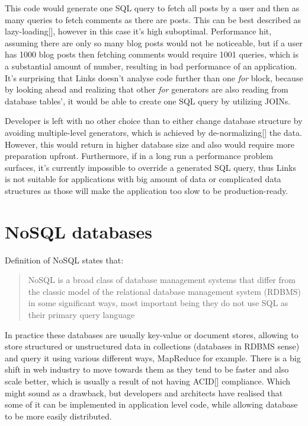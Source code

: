 This code would generate one SQL query to fetch all posts by a user and then as many queries to fetch comments as there are posts. This can be best described as lazy-loading[], however in this case it's high suboptimal. Performance hit, assuming there are only so many blog posts would not be noticeable, but if a user has 1000 blog posts then fetching comments would require 1001 queries, which is a substantial amount of number, resulting in bad performance of an application. It's surprising that Links doesn't analyse code further than one \textit{for} block, because by looking ahead and realizing that other \textit{for} generators are also reading from database tables', it would be able to create one SQL query by utilizing JOINs. 

Developer is left with no other choice than to either change database structure by avoiding multiple-level generators, which is achieved by de-normalizing[] the data. However, this would return in higher database size and also would require more preparation upfront. Furthermore, if in a long run a performance problem surfaces, it's currently impossible to override a generated SQL query, thus Links is not suitable for applications with big amount of data or complicated data structures as those will make the application too slow to be production-ready.

\section{NoSQL databases}

Definition of NoSQL states that:

\begin{quote}
NoSQL is a broad class of database management systems that differ from the classic model of the relational database management system (RDBMS) in some significant ways, most important being they do not use SQL as their primary query language
\end{quote}

In practice these databases are usually key-value or document stores, allowing to store structured or unstructured data in collections (databases in RDBMS sense) and query it using various different ways, MapReduce for example. There is a big shift in web industry to move towards them as they tend to be faster and also scale better, which is usually a result of not having ACID[] compliance. Which might sound as a drawback, but developers and architects have realised that some of it can be implemented in application level code, while allowing database to be more easily distributed. 


